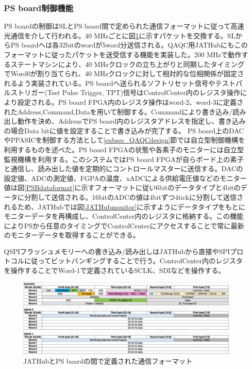 \subsubsection{\textbf{PS board制御機能}}

PS boardの制御はSLとPS board間で定められた通信フォーマットに従って高速光通信を介して行われる。40 MHzごとに図\ref{JATHubpsbformat}に示すパケットを交換する。SLからPS boardへは各32bitのwordが5word分送信される。QAQC用JATHubにもこのフォーマットに従ったパケットを送受信する機能を実装した。200 MHzで動作するステートマシンにより、40 MHzクロックの立ち上がりと同期したタイミングでWord0が割り当てられ、40 MHzクロックに対して相対的な位相関係が固定されるよう実装されている。PS boardへ送られるソフトリセット信号やテストパルストリガー(Test Pulse Trigger, TPT)信号はControlCenter内のレジスタ操作により設定される。PS board FPGA内のレジスタ操作はword-2、word-3に定義されたAddress,Command,Dataを用いて制御する。Commandにより書き込み/読み出し動作を決め、AddressでPS board内のレジスタアドレスを指定し、書き込みの場合Data bitに値を設定することで書き込みが完了する。
PS board上のDACやPPASICを制御する方法として\ref{subsec_QAQCdesign}節では自立型制御機構を利用するものを述べた。PS board FPGAの状態や各素子のモニターには自立型監視機構を利用する。このシステムではPS board FPGAが自らボード上の素子と通信し、読み出した値を定期的にコントロールマスターに送信する。DACの設定値、ADCの測定値、FGPAの温度、xADCによる供給電圧値などのモニター値は図\ref{PSBdataformat}に示すフォーマットに従い6bitのデータタイプと4bitのデータに分割して送信される。16bitのADCの値は4bitずつ4tickに分割して送信されるため、JATHubでは図\ref{JATHubmonitor}に示すようにデータタイプをもとにモニターデータを再構成し、ControlCenter内のレジスタに格納する。この機能によりPSから任意のタイミングでControlCenterにアクセスすることで常に最新のモニターデータを取得することができる。

QSPIフラッシュメモリーへの書き込み/読み出しはJATHubから直接やSPIプロトコルに従ってビットバンギングすることで行う。ControlCenter内のレジスタを操作することでWord-1で定義されているSCLK、SDIなどを操作する。
\baselineskip

\begin{figure} 
\centering
\includegraphics[width=16cm]{fig/JATHubpsbformat.png}
\caption[JATHubとPS boardの間で定義された通信フォーマット]{JATHubとPS boardの間で定義された通信フォーマット}
\label{JATHubpsbformat}
\end{figure}

